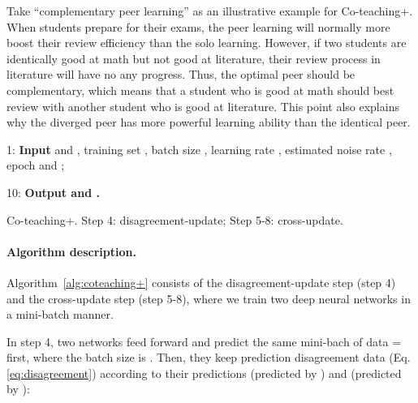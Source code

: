\documentclass{article}
\begin{document}
Take ``complementary peer learning'' as an illustrative example for Co-teaching+. When students prepare for their exams, the peer learning will normally more boost their review efficiency than the solo learning. However, if two students are identically good at math but not good at literature, their review process in literature will have no any progress. Thus, the optimal peer should be complementary, which means that a student who is good at math should best review with another student who is good at literature. This point also explains why the diverged peer has more powerful learning ability than the identical peer.

\begin{algorithm}[!tp]\small
1: {\bfseries Input}  and , training set , batch size , learning rate , estimated noise rate , epoch  and ;


10: {\bfseries Output  and .}
\caption{Co-teaching+. Step 4: disagreement-update; Step 5-8: cross-update.}
\label{alg:coteaching+}
\end{algorithm}

\paragraph{Algorithm description.} Algorithm~\ref{alg:coteaching+} consists of the disagreement-update step (step 4) and the cross-update step (step 5-8), where we train two deep neural networks in a mini-batch manner.

In step 4, two networks feed forward and predict the same mini-bach of data = first, where the batch size is . Then, they keep prediction disagreement data  (Eq. \eqref{eq:disagreement}) according to their predictions  (predicted by ) and  (predicted by ):
\end{document}
